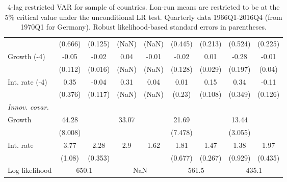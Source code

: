 \begin{table}[htbp]
\begin{tabular}{@{\extracolsep{4pt}}lcccccccc@{}}
 		 & (0.666) 	 & (0.125) 	 & (NaN) 	 & (NaN) 	 & (0.445) 	 & (0.213) 	 & (0.524) 	 & (0.225) 	 \\ 
\quad Growth (-4) 	 &-0.05 	 & -0.02 	 & 0.04 	 & -0.01 	 & -0.02 	 & 0.01 	 & -0.28 	 & -0.01	 \\ 
 		 & (0.112) 	 & (0.016) 	 & (NaN) 	 & (NaN) 	 & (0.128) 	 & (0.029) 	 & (0.197) 	 & (0.04) 	 \\ 
\quad Int. rate (-4) 	 &0.35 	 & -0.04 	 & 0.31 	 & 0.04 	 & 0.01 	 & 0.15 	 & 0.34 	 & -0.11	 \\ 
 		 & (0.376) 	 & (0.117) 	 & (NaN) 	 & (NaN) 	 & (0.23) 	 & (0.108) 	 & (0.349) 	 & (0.126) 	 \\ 
\rule{0pt}{4ex} \emph{Innov. covar.}  	 & 	 & 	 & 	 & 	 & 	 & 	 & 	 &\\ 
\quad Growth 	 &44.28 	 &  	 & 33.07 	 &  	 & 21.69 	 &  	 & 13.44 	 & 	 \\ 
 		 & (8.008) 	 &  	 &  	 &  	 & (7.478) 	 &  	 & (3.055) 	 &  	 \\ 
\quad Int. rate 	 &3.77 	 & 2.28 	 & 2.9 	 & 1.62 	 & 1.81 	 & 1.47 	 & 1.38 	 & 1.97	 \\ 
 		 & (1.08) 	 & (0.353) 	 &  	 &  	 & (0.677) 	 & (0.267) 	 & (0.929) 	 & (0.435) 	 \\ 
 \hline \rule{0pt}{4ex} 
  Log likelihood 	 &\multicolumn{2}{c}{650.1} 	 & \multicolumn{2}{c}{NaN} 	 & \multicolumn{2}{c}{561.5} 	 & \multicolumn{2}{c}{435.1}\\ 

 \hline 	\end{tabular}		\caption{4-lag restricted VAR for sample of countries. Lon-run means are
                      restricted to be at the 5\% critical value under the unconditional
                      LR test. Quarterly data 1966Q1-2016Q4 (from 1970Q1 for Germany).
                      Robust likelihood-based standard errors in parentheses.}
		\label{tab:all_rest_1lag}

\end{table}